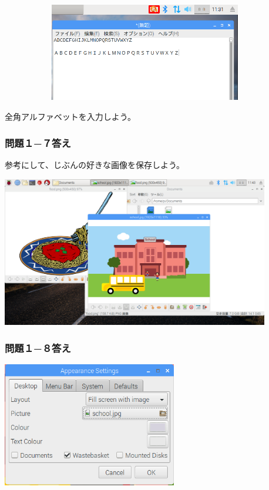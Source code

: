 \documentclass[a4paper,12pt]{jarticle}
\begin{document}
\bigskip

\bigskip


\centering
\includegraphics[width=12.631cm,height=4.297cm]{textbook-img220.png}
\flushleft

\bigskip

全角アルファベットを入力しよう。
\clearpage

\subsubsection{\bfseries
問題１−７答え}

参考にして、じぶんの好きな画像を保存しよう。

\centering
\includegraphics[width=11.705cm,height=6.581cm]{textbook-img221.png}
\flushleft

\bigskip


\subsubsection{\bfseries
問題１−８答え}



\centering
\includegraphics[width=7.631cm,height=5.44cm]{textbook-img222.png}
\end{document}
